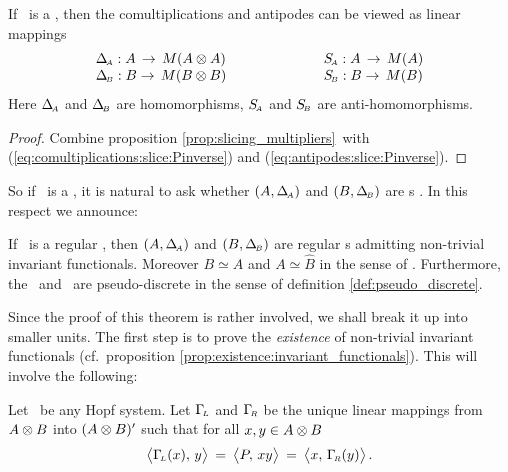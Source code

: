 \begin{lemma_sec} \label{lem:mhs:comultiplications}
If\/ \pairAB\ is a \mhs, then the comultiplications and antipodes can be viewed
as linear mappings
$$ \begin{array}{lcl}
     \Delta_{\scriptscriptstyle \! A}: A \,\rightarrow\, M(A \otimes A)  & \hspace{5em} &
      S_{\scriptscriptstyle \! A}:    A \,\rightarrow\, M(A)  \\
     \Delta_{\scriptscriptstyle \! B}: B \rightarrow\, M(B \otimes B)  & &
      S_{\scriptscriptstyle \! B}:     B \rightarrow\, M(B)
   \end{array} $$
\rm Here $\Delta_{\scriptscriptstyle \! A}$ and $\Delta_{\scriptscriptstyle \! B}$ are homomorphisms, $S_{\scriptscriptstyle \! A}$ and $S_{\scriptscriptstyle \! B}$ are anti-homomorphisms.
\end{lemma_sec}
\begin{proof}
Combine proposition \ref{prop:slicing_multipliers}\ with
(\ref{eq:comultiplications:slice:Pinverse}) and
(\ref{eq:antipodes:slice:Pinverse}).
\end{proof}
\vspace{2ex}


So if \pairAB\ is a \mhs, it is natural to ask whether $(A,\Delta_{\scriptscriptstyle \! A})$ and $(B,\Delta_{\scriptscriptstyle \! B})$
are \mha s \cite{Fons:MHA}\@. In this respect we announce:

\begin{thm_sec} \label{thm:mhs_yields_mha}
If\/ \pairAB\ is a regular \mhs,
then $(A,\Delta_{\scriptscriptstyle \! A})$ and\/ $(B,\Delta_{\scriptscriptstyle \! B})$ are regular \mha s admitting non-trivial invariant
functionals. Moreover\/ $B\simeq \hat{A}$ and\/ $A\simeq \hat{B}$ in the sense of
\cite{Fons:AFGD:proc,Fons:AFGD}\@.
Furthermore, the \contexts\/ \Aa\ and\/ \BB\ are pseudo-discrete in the sense of
definition \ref{def:pseudo_discrete}\@.
\end{thm_sec}


Since the proof of this theorem is rather involved, we shall break it up into smaller units.
The first step is to prove the {\em existence\/} of non-trivial invariant functionals
(cf.\ proposition \ref{prop:existence:invariant_functionals}).
This will involve the following:


\begin{defn_sec*} \label{def:GammaLGammaR}
Let \pairAB\ be any Hopf system.
Let $\Gamma_{\!\scriptscriptstyle L}$ and $\Gamma_{\!\scriptscriptstyle R}$ be the unique linear mappings from $A\otimes B$ into $(A \otimes B)'$
such that for all $x,y \in A\otimes B$
\begin{equation}\label{eq:def:Gammas}
  \pairM{\GamL(x)}{y} \:=\:    \pairM{P}{xy}  \:=\:  \pairM{x}{\GamR(y)}.
\end{equation}
\end{defn_sec*}


